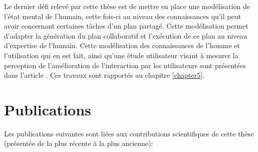 \documentclass[a4paper,11pt,twoside]{StyleThese}
\begin{document}
Le dernier défi relevé par cette thèse est de mettre en place une modélisation de l'état mental de l'humain, cette fois-ci au niveau des connaissances qu'il peut avoir concernant certaines tâches d'un plan partagé. Cette modélisation permet d'adapter la génération du plan collaboratif et l'exécution de ce plan au niveau d'expertise de l'humain. Cette modélisation des connaissances de l'homme et l'utilisation qui en est fait, ainsi qu'une étude utilisateur visant à mesurer la perception de l'amélioration de l'interaction par les utilisateurs sont présentées dans l'article \cite{Milliez16}. Ces travaux sont rapportés au chapitre \ref{chapter5}.





\section{Publications}

Les publications suivantes sont liées aux contributions scientifiques de cette thèse (présentée de la plus récente à la plus ancienne):
\end{document}
